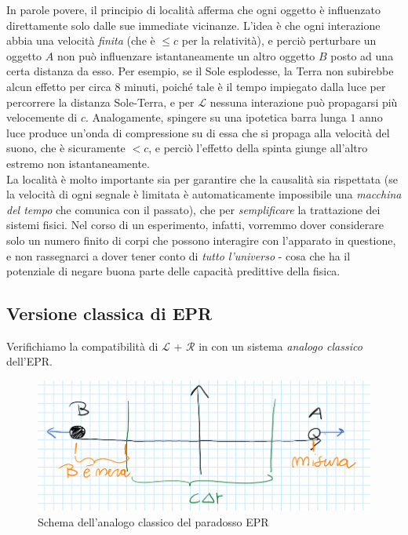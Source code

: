 \documentclass[../../FisicaTeorica.tex]{subfiles}
\begin{document}
\begin{itemize}
In parole povere, il principio di località afferma che ogni oggetto è influenzato direttamente solo dalle sue immediate vicinanze. L'idea è che ogni interazione abbia una velocità \textit{finita} (che è $\leq c$ per la relatività), e perciò perturbare un oggetto $A$ non può influenzare istantaneamente un altro oggetto $B$ posto ad una certa distanza da esso. Per esempio, se il Sole esplodesse, la Terra non subirebbe alcun effetto per circa $8$ minuti, poiché tale è il tempo impiegato dalla luce per percorrere la distanza Sole-Terra, e per $\mathcal{L}$ nessuna interazione può propagarsi più velocemente di $c$. Analogamente, spingere su una ipotetica barra lunga $1$ anno luce produce un'onda di compressione su di essa che si propaga alla velocità del suono, che è sicuramente $< c$, e perciò l'effetto della spinta giunge all'altro estremo non istantaneamente.\\
La località è molto importante sia per garantire che la causalità sia rispettata (se la velocità di ogni segnale è limitata è automaticamente impossibile una \textit{macchina del tempo} che comunica con il passato), che per \textit{semplificare} la trattazione dei sistemi fisici. Nel corso di un esperimento, infatti, vorremmo dover considerare solo un numero finito di corpi che possono interagire con l'apparato in questione, e non rassegnarci a dover tener conto di \textit{tutto l'universo} - cosa che ha il potenziale di negare buona parte delle capacità predittive della fisica.
\end{itemize}


\subsection{Versione classica di EPR}
Verifichiamo la compatibilità di $\mathcal{L}$ + $\mathcal{R}$ in \MC con un sistema \textit{analogo classico} dell'EPR.
\begin{figure}[H]
\centering
\includegraphics[scale=0.4]{Immagini/19_12/image002.png}
\caption{Schema dell'analogo classico del paradosso EPR}
\end{figure}
\end{document}
